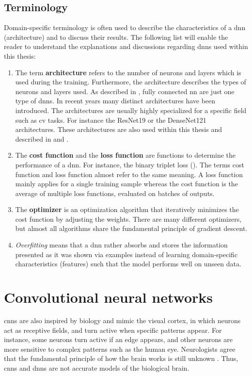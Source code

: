\subsection{Terminology}
Domain-specific terminology is often used to describe the characteristics of a \ac{dnn} (architecture) and to discuss their results. The following list will enable the reader to understand the explanations and discussions regarding \acp{dnn} used within this thesis:
%
\begin{enumerate}
	\item The term \textbf{architecture} refers to the number of neurons and layers which is used during the training. Furthermore, the architecture describes the types of neurons and layers used. As described in , fully connected \ac{nn} are just one type of \acp{dnn}. In recent years many distinct architectures have been introduced. The architectures are usually highly specialized for a specific field such as \ac{cv} tasks. For instance the ResNet19 or the DenseNet121 architectures. These architectures are also used within this thesis and described in  and .
	\item The \textbf{cost function} and the \textbf{loss function} are functions to determine the performance of a \ac{dnn}. For instance, the binary triplet loss (). The terms cost function and loss function almost refer to the same meaning. A loss function mainly applies for a single training sample whereas the cost function is the average of multiple loss functions, evaluated on batches of outputs.
	\item The \textbf{optimizer} is an optimization algorithm that iteratively minimizes the cost function by adjusting the weights. There are many different optimizers, but almost all algorithms share the fundamental principle of gradient descent.
	\item \textit{Overfitting} means that a \ac{dnn} rather absorbs and stores the information presented as it was shown via examples instead of learning domain-specific characteristics (features) such that the model performs well on unseen data. 
\end{enumerate}
%
\section{Convolutional neural networks}
\label{sec:cnns}
\acp{cnn} are also inspired by biology and mimic the visual cortex, in which neurons act as receptive fields, and turn active when specific patterns appear. For instance, some neurons turn active if an edge appears, and other neurons are more sensitive to complex patterns such as the human eye. Neurologists agree that the fundamental principle of how the brain works is still unknown \cite{Savage19}. Thus, \acp{cnn} and \acp{dnn} are not accurate models of the biological brain.\\

